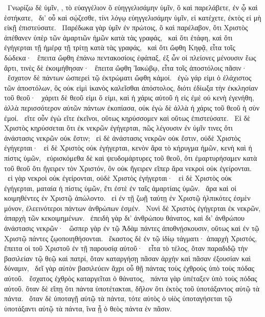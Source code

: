 ~Γνωρίζω δὲ ὑμῖν, , τὸ εὐαγγέλιον ὃ εὐηγγελισάμην ὑμῖν, ὃ καὶ παρελάβετε, ἐν ᾧ καὶ ἑστήκατε,
~δι’ οὗ καὶ σῴζεσθε, τίνι λόγῳ εὐηγγελισάμην ὑμῖν, εἰ κατέχετε, ἐκτὸς εἰ μὴ εἰκῇ ἐπιστεύσατε.
~Παρέδωκα γὰρ ὑμῖν ἐν πρώτοις, ὃ καὶ παρέλαβον, ὅτι Χριστὸς ἀπέθανεν ὑπὲρ τῶν ἁμαρτιῶν ἡμῶν κατὰ τὰς γραφάς,
~καὶ ὅτι ἐτάφη, καὶ ὅτι ἐγήγερται τῇ ἡμέρᾳ τῇ τρίτῃ κατὰ τὰς γραφάς,
~καὶ ὅτι ὤφθη Κηφᾷ, εἶτα τοῖς δώδεκα·
~ἔπειτα ὤφθη ἐπάνω πεντακοσίοις  ἐφάπαξ, ἐξ ὧν οἱ πλείονες μένουσιν ἕως ἄρτι, τινὲς δὲ ἐκοιμήθησαν·
~ἔπειτα ὤφθη Ἰακώβῳ, εἶτα τοῖς ἀποστόλοις πᾶσιν·
~ἔσχατον δὲ πάντων ὡσπερεὶ τῷ ἐκτρώματι ὤφθη κἀμοί.
~ἐγὼ γάρ εἰμι ὁ ἐλάχιστος τῶν ἀποστόλων, ὃς οὐκ εἰμὶ ἱκανὸς καλεῖσθαι ἀπόστολος, διότι ἐδίωξα τὴν ἐκκλησίαν τοῦ θεοῦ·
~χάριτι δὲ θεοῦ εἰμι ὅ εἰμι, καὶ ἡ χάρις αὐτοῦ ἡ εἰς ἐμὲ οὐ κενὴ ἐγενήθη, ἀλλὰ περισσότερον αὐτῶν πάντων ἐκοπίασα, οὐκ ἐγὼ δὲ ἀλλὰ ἡ χάρις τοῦ θεοῦ ἡ σὺν ἐμοί.
~εἴτε οὖν ἐγὼ εἴτε ἐκεῖνοι, οὕτως κηρύσσομεν καὶ οὕτως ἐπιστεύσατε.
~Εἰ δὲ Χριστὸς κηρύσσεται ὅτι ἐκ νεκρῶν ἐγήγερται, πῶς λέγουσιν ἐν ὑμῖν τινες ὅτι ἀνάστασις νεκρῶν οὐκ ἔστιν;
~εἰ δὲ ἀνάστασις νεκρῶν οὐκ ἔστιν, οὐδὲ Χριστὸς ἐγήγερται·
~εἰ δὲ Χριστὸς οὐκ ἐγήγερται, κενὸν ἄρα τὸ κήρυγμα ἡμῶν, κενὴ καὶ ἡ πίστις ὑμῶν,
~εὑρισκόμεθα δὲ καὶ ψευδομάρτυρες τοῦ θεοῦ, ὅτι ἐμαρτυρήσαμεν κατὰ τοῦ θεοῦ ὅτι ἤγειρεν τὸν Χριστόν, ὃν οὐκ ἤγειρεν εἴπερ ἄρα νεκροὶ οὐκ ἐγείρονται.
~εἰ γὰρ νεκροὶ οὐκ ἐγείρονται, οὐδὲ Χριστὸς ἐγήγερται·
~εἰ δὲ Χριστὸς οὐκ ἐγήγερται, ματαία ἡ πίστις ὑμῶν, ἔτι ἐστὲ ἐν ταῖς ἁμαρτίαις ὑμῶν.
~ἄρα καὶ οἱ κοιμηθέντες ἐν Χριστῷ ἀπώλοντο.
~εἰ ἐν τῇ ζωῇ ταύτῃ ἐν Χριστῷ ἠλπικότες ἐσμὲν μόνον, ἐλεεινότεροι πάντων ἀνθρώπων ἐσμέν.
~Νυνὶ δὲ Χριστὸς ἐγήγερται ἐκ νεκρῶν, ἀπαρχὴ τῶν κεκοιμημένων.
~ἐπειδὴ γὰρ δι’ ἀνθρώπου θάνατος, καὶ δι’ ἀνθρώπου ἀνάστασις νεκρῶν·
~ὥσπερ γὰρ ἐν τῷ Ἀδὰμ πάντες ἀποθνῄσκουσιν, οὕτως καὶ ἐν τῷ Χριστῷ πάντες ζῳοποιηθήσονται.
~ἕκαστος δὲ ἐν τῷ ἰδίῳ τάγματι· ἀπαρχὴ Χριστός, ἔπειτα οἱ τοῦ Χριστοῦ ἐν τῇ παρουσίᾳ αὐτοῦ·
~εἶτα τὸ τέλος, ὅταν παραδιδῷ τὴν βασιλείαν τῷ θεῷ καὶ πατρί, ὅταν καταργήσῃ πᾶσαν ἀρχὴν καὶ πᾶσαν ἐξουσίαν καὶ δύναμιν,
~δεῖ γὰρ αὐτὸν βασιλεύειν ἄχρι οὗ θῇ πάντας τοὺς ἐχθροὺς ὑπὸ τοὺς πόδας αὐτοῦ.
~ἔσχατος ἐχθρὸς καταργεῖται ὁ θάνατος,
~πάντα γὰρ ὑπέταξεν ὑπὸ τοὺς πόδας αὐτοῦ. ὅταν δὲ εἴπῃ ὅτι πάντα ὑποτέτακται, δῆλον ὅτι ἐκτὸς τοῦ ὑποτάξαντος αὐτῷ τὰ πάντα.
~ὅταν δὲ ὑποταγῇ αὐτῷ τὰ πάντα, τότε αὐτὸς ὁ υἱὸς ὑποταγήσεται τῷ ὑποτάξαντι αὐτῷ τὰ πάντα, ἵνα ᾖ ὁ θεὸς πάντα ἐν πᾶσιν.
